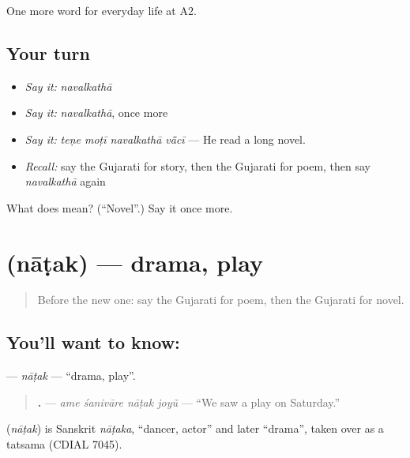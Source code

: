 \begin{grammarlens}[title={What you've built}]
One more word for everyday life at A2.
\end{grammarlens}

\subsection*{Your turn}
\begin{itemize}
\raggedright
  \item \emph{Say it:} \emph{navalkathā}
  \item \emph{Say it:} \emph{navalkathā}, once more
  \item \emph{Say it:} \emph{teṇe moṭī navalkathā vā̃cī} — He read a long novel.
  \item \emph{Recall:} say the Gujarati for story, then the Gujarati for poem, then say \emph{navalkathā} again
\end{itemize}

\begin{tcolorbox}[breakable,colback=teal!4,colframe=teal!35!black,title={Before you move on}]
What does  mean? (\textquotedblleft{}Novel\textquotedblright{}.) Say it once more.
\end{tcolorbox}
\section[\texorpdfstring{\gu{નાટક} (nāṭak)}{નાટક (nāṭak)}]{ (nāṭak) — drama, play}

\label{lesson:GU-C255-natak}



\begin{quote}
Before the new one: say the Gujarati for poem, then the Gujarati for novel.
\end{quote}

\subsection*{You'll want to know: }
\textbf{} — \emph{nāṭak} — \textquotedblleft{}drama, play\textquotedblright{}.

\begin{quote}
\textbf{   .} — \emph{ame śanivāre nāṭak joyũ} — \textquotedblleft{}We saw a play on Saturday.\textquotedblright{}
\end{quote}

\begin{cousinweb}
\textbf{} (\emph{nāṭak}) is Sanskrit \emph{nāṭaka}, \textquotedblleft{}dancer, actor\textquotedblright{} and later \textquotedblleft{}drama\textquotedblright{}, taken over as a tatsama (CDIAL 7045).
\end{cousinweb}


